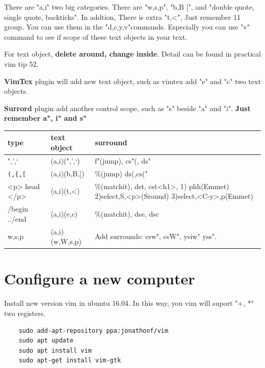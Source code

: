 \documentclass[paper=8.5in:11in, twoside, 12pt, pagesize=pdftex]{book}
\begin{document}
There are "a,i" two big categories. There are "w,s,p", "b,B $[$", and "double quote, single quote, backticks". In addtion, There is extra "t,<", Just remember 11 group. You can use them in the "d,c,y,v"commands. Especially you can use "v" command to see if scope of these text objects in your text.  

For text object,  \textbf{delete around, change inside}. Detail can be found in practical vim tip 52. 

\textbf{VimTex} plugin will add new text object, such as vimtex add "e" and "c" two text objects. 

\textbf{Surrord} plugin add another control scope, such as "s" beside "a" and "i".  \textbf{Just remember a", i" and s"}


\begin{tabular}{|p{}|p{}|p{}|}
	\hline 
	type & text object & surround \\
	
	\hline 
	",',`  & (a,i)(",',`) & f"(jump), cs"(, ds" \\
	
	\hline 
	\verb=(,{,[= & (a,i)(b,B,$[$) & \%(jump) ds(,cs("  \\
		
		\hline 
		<p> head </p> & (a,i)(t,<) & \%(matchit), dst, cst<h1>, 1) phh(Emmet) 2)select,S,<p>(Sround) 3)select,<C-y>,p(Emmet) \\
		
		\hline
		/begin ../end & (a,i)(e,c) & \%(matchit), dse, dsc \\
		
		\hline 
		w,s,p & (a,i)(w,W,s,p) & Add surrounds: csw", csW", ysiw" yss".  \\
		
		\hline 
	\end{tabular}
		
\section{Configure a new computer}



Install new version vim in ubuntu 16.04. In this way, you vim will suport "+, *" two registers. 
\begin{verbatim}
	sudo add-apt-repository ppa:jonathonf/vim
	sudo apt update
	sudo apt install vim
	sudo apt-get install vim-gtk
\end{verbatim}
\end{document}
